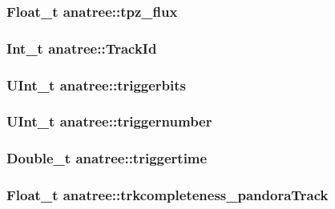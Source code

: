 \hypertarget{classanatree_a0767befdb5d471ec79819c9f3aff9030}{
\subsubsection[{tpz\-\_\-flux}]{\setlength{\rightskip}{0pt plus 5cm}Float\-\_\-t anatree\-::tpz\-\_\-flux}}\label{classanatree_a0767befdb5d471ec79819c9f3aff9030}
\hypertarget{classanatree_a01c9a26606481a2f8463e30b238c0181}{
\subsubsection[{Track\-Id}]{\setlength{\rightskip}{0pt plus 5cm}Int\-\_\-t anatree\-::\-Track\-Id}}\label{classanatree_a01c9a26606481a2f8463e30b238c0181}
\hypertarget{classanatree_a846894b838aa8c620d1b1f4a832fab02}{
\subsubsection[{triggerbits}]{\setlength{\rightskip}{0pt plus 5cm}U\-Int\-\_\-t anatree\-::triggerbits}}\label{classanatree_a846894b838aa8c620d1b1f4a832fab02}
\hypertarget{classanatree_a69ac24922aa2a34dcefe468b811de0ba}{
\subsubsection[{triggernumber}]{\setlength{\rightskip}{0pt plus 5cm}U\-Int\-\_\-t anatree\-::triggernumber}}\label{classanatree_a69ac24922aa2a34dcefe468b811de0ba}
\hypertarget{classanatree_ac4405283b1417b54efb3a249080cae37}{
\subsubsection[{triggertime}]{\setlength{\rightskip}{0pt plus 5cm}Double\-\_\-t anatree\-::triggertime}}\label{classanatree_ac4405283b1417b54efb3a249080cae37}
\hypertarget{classanatree_ae61e5564601170300a2631b20ac7de0d}{
\subsubsection[{trkcompleteness\-\_\-pandora\-Track}]{\setlength{\rightskip}{0pt plus 5cm}Float\-\_\-t anatree\-::trkcompleteness\-\_\-pandora\-Track}}\label{classanatree_ae61e5564601170300a2631b20ac7de0d}
